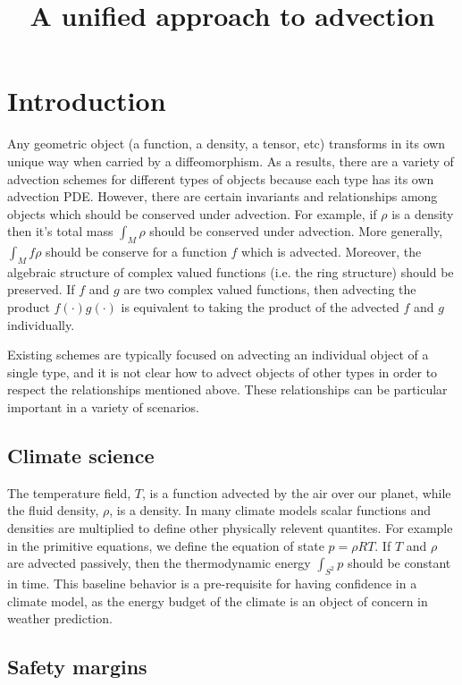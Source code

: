 \documentclass[12pt]{amsart}
\title{A unified approach to advection}
\begin{document}
\maketitle

\section{Introduction}
\label{sec:intro}

  Any geometric object (a function, a density, a tensor, etc) transforms in its own unique way when carried by a diffeomorphism.
As a results, there are a variety of advection schemes for different types of
objects because each type has its own advection PDE.
However, there are certain invariants and relationships
among objects which should be conserved under advection.
For example, if $\rho$ is a density then it's total mass $\int_M \rho$
should be conserved under advection.
More generally, $\int_M f \rho$ should be conserve for a function $f$ 
which is advected.
Moreover, the algebraic structure of complex valued functions (i.e. the ring structure) should be preserved.
If $f$ and $g$ are two complex valued functions, then 
advecting the product $f(\cdot) g(\cdot)$ is equivalent to taking the
product of the advected $f$ and $g$ individually.

Existing schemes are typically focused on advecting an individual 
object of a single type, and it is not clear how to advect objects
of other types in order to respect the relationships mentioned above.
These relationships can be particular important in a variety of scenarios.

\subsection{Climate science}
\label{sec:climate}

The temperature field, $T$, is a function advected by the air
over our planet,
while the fluid density, $\rho$, is a density.
In many climate models scalar functions and densities are multiplied to
define other physically relevent quantites.
For example in the primitive equations, we define the equation of state $p = \rho R T$.
If $T$ and $\rho$ are advected passively, then the
thermodynamic energy $\int_{S^2}p$ should be constant in time.
This baseline behavior is a pre-requisite for having confidence in a climate model, as the energy budget of the climate is an object of concern in weather prediction.

\subsection{Safety margins}
\label{sec:safety}
\end{document}
